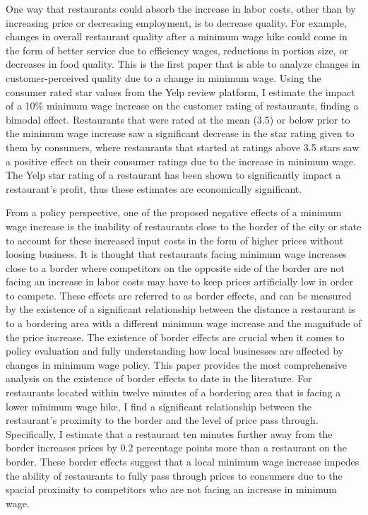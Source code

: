 \documentclass[11pt]{article}
\begin{document}
One way that restaurants could absorb the increase in labor costs, other than by increasing price or decreasing employment, is to decrease quality. For example, changes in overall restaurant quality after a minimum wage hike could come in the form of better service due to efficiency wages, reductions in portion size, or decreases in food quality.  This is the first paper that is able to analyze changes in customer-perceived quality due to a change in minimum wage. Using the consumer rated star values from the Yelp review platform, I estimate the impact of a 10\% minimum wage increase on the customer rating of restaurants, finding a bimodal effect. %
Restaurants that were rated at the mean (3.5) or below prior to the minimum wage increase saw a significant decrease in the star rating given to them by consumers, where restaurants that started at ratings above 3.5 stars saw a positive effect on their consumer ratings due to the increase in minimum wage. The Yelp star rating of a restaurant has been shown to significantly impact a restaurant's profit, thus these estimates are economically significant.  

From a policy perspective, one of the proposed negative effects of a minimum wage increase is the inability of restaurants close to the border of the city or state to account for these increased input costs in the form of higher prices without loosing business. It is thought that restaurants facing minimum wage increases close to a border where competitors on the opposite side of the border are not facing an increase in labor costs may have to keep prices artificially low in order to compete. These effects are referred to as border effects, and can be measured by the existence of a significant relationship between the distance a restaurant is to a bordering area with a different minimum wage increase and the magnitude of the price increase. The existence of border effects are crucial when it comes to policy evaluation and fully understanding how local businesses are affected by changes in minimum wage policy. This paper provides the most comprehensive analysis on the existence of border effects to date in the literature. For restaurants located within twelve minutes of a bordering area that is facing a lower minimum wage hike, I find a significant relationship between the restaurant's proximity to the border and the level of price pass through. Specifically, I estimate that a restaurant ten minutes further away from the border increases prices by 0.2 percentage points more than a restaurant on the border. These border effects suggest that a local minimum wage increase impedes the ability of restaurants to fully pass through prices to consumers due to the spacial proximity to competitors who are not facing an increase in minimum wage. 
\end{document}
